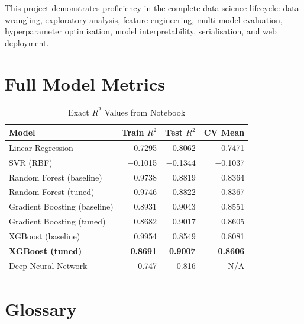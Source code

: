 \documentclass[12pt,a4paper]{report}
\begin{document}
This project demonstrates proficiency in the complete data science lifecycle: data wrangling, exploratory analysis, feature engineering, multi-model evaluation, hyperparameter optimisation, model interpretability, serialisation, and web deployment.

\appendix

\chapter{Full Model Metrics}

\begin{table}[H]
\centering
\caption{Exact $R^2$ Values from Notebook}
\begin{tabular}{lrrr}
\toprule
\textbf{Model} & \textbf{Train $R^2$} & \textbf{Test $R^2$} & \textbf{CV Mean} \\
\midrule
Linear Regression            & 0.7295    & 0.8062    & 0.7471 \\
SVR (RBF)                    & $-$0.1015 & $-$0.1344 & $-$0.1037 \\
Random Forest (baseline)     & 0.9738    & 0.8819    & 0.8364 \\
Random Forest (tuned)        & 0.9746    & 0.8822    & 0.8367 \\
Gradient Boosting (baseline) & 0.8931    & 0.9043    & 0.8551 \\
Gradient Boosting (tuned)    & 0.8682    & 0.9017    & 0.8605 \\
XGBoost (baseline)           & 0.9954    & 0.8549    & 0.8081 \\
\textbf{XGBoost (tuned)}     & \textbf{0.8691} & \textbf{0.9007} & \textbf{0.8606} \\
Deep Neural Network          & 0.747     & 0.816     & N/A \\
\bottomrule
\end{tabular}
\end{table}

\chapter{Glossary}
\end{document}
